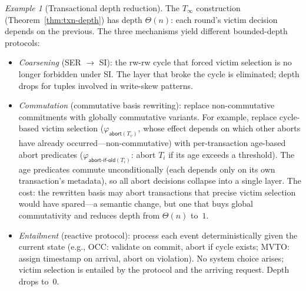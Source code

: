 \documentclass[acmsmall,review,anonymous]{acmart}
\theoremstyle{remark}
\newtheorem{example}{Example}
\numberwithin{definition}{section}
\numberwithin{theorem}{section}
\numberwithin{lemma}{section}
\numberwithin{corollary}{section}
\numberwithin{remark}{section}
\numberwithin{example}{section}
\numberwithin{observation}{section}
\numberwithin{assumption}{section}
\begin{document}
\begin{example}[Transactional depth reduction]
  \label{ex:depth-reduction-txn}
  The $T_\infty$ construction (Theorem~\ref{thm:txn-depth}) has depth
  $\Theta(n)$: each round's victim decision depends on the previous.
  The three mechanisms yield different bounded-depth protocols:
  \begin{itemize}[nosep]
    \item \emph{Coarsening} (SER $\to$ SI): the rw-rw cycle that
          forced victim selection is no longer forbidden under SI.
          The layer that broke the cycle is eliminated; depth drops for
          tuples involved in write-skew patterns.
    \item \emph{Commutation} (commutative basis rewriting): replace
          non-commutative commitments with globally commutative
          variants.
          For example, replace cycle-based victim selection
          ($\varphi_{\mathsf{abort}(T_v)}$, whose effect depends on
          which other aborts have already occurred---non-commutative)
          with per-transaction age-based abort predicates
          ($\varphi_{\mathsf{abort\text{-}if\text{-}old}(T_i)}$: abort
          $T_i$ if its age exceeds a threshold).
          The age predicates commute unconditionally (each depends only
          on its own transaction's metadata), so all abort decisions
          collapse into a single layer.
          The cost: the rewritten basis may abort transactions that
          precise victim selection would have spared---a semantic
          change, but one that buys global commutativity and reduces
          depth from $\Theta(n)$ to~$1$.
    \item \emph{Entailment} (reactive protocol): process each event
          deterministically given the current state (e.g., OCC:
          validate on commit, abort if cycle exists; MVTO: assign
          timestamp on arrival, abort on violation).
          No system choice arises; victim selection is entailed by the
          protocol and the arriving request.
          Depth drops to~$0$.
  \end{itemize}
\end{example}
\end{document}
